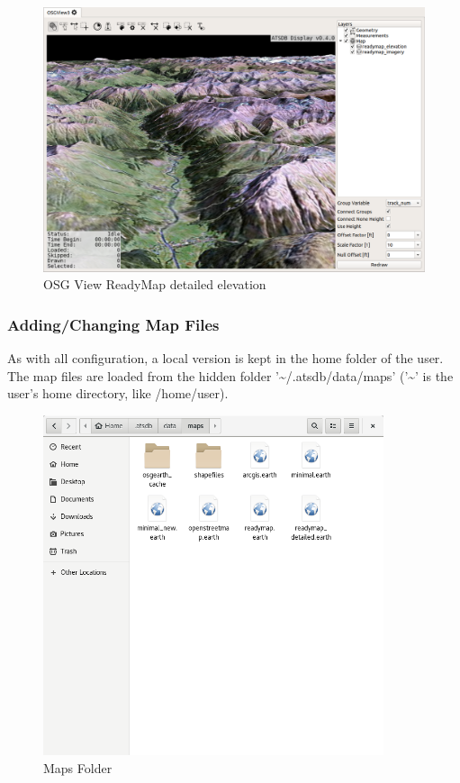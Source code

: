 {\begin{figure}[H]
    \hspace*{-2cm}
    \includegraphics[width=18cm]{../screenshots/osgview_readymap_elav.png}
  \caption{OSG View ReadyMap detailed elevation}
\end{figure}

\subsubsection{Adding/Changing Map Files}
\label{sec:adding_maps}

As with all configuration, a local version is kept in the home folder of the user. The map files are loaded from the hidden folder '\textasciitilde/.atsdb/data/maps' ('\textasciitilde' is the user's home directory, like /home/user).

\begin{figure}[H]
    \includegraphics[width=10cm,frame]{../screenshots/maps_config.png}
  \caption{Maps Folder}
\end{figure}

}
